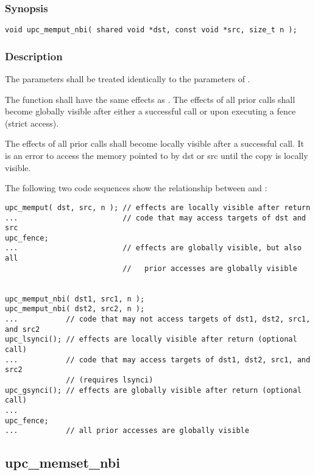 \subsubsection{Synopsis}

\begin{verbatim}
void upc_memput_nbi( shared void *dst, const void *src, size_t n );
\end{verbatim}

\subsubsection{Description}

\npf The parameters shall be treated identically to the parameters of
\memput{}.

\np The \function{} function shall have the same effects as \memput{}.
The effects of all prior \function{} calls shall become globally visible after 
either a successful \gsynci{} call or upon executing a fence (strict access).

\np The effects of all prior \function{} calls shall become locally 
visible after a successful \lsynci{} call.  It is an error to access the memory
pointed to by dst or src until the copy is locally visible.

\np The following two code sequences show the relationship between
\memput{} and \function{}:

\begin{verbatim} 
upc_memput( dst, src, n ); // effects are locally visible after return
...                        // code that may access targets of dst and src
upc_fence;                 
...                        // effects are globally visible, but also all
                           //   prior accesses are globally visible


upc_memput_nbi( dst1, src1, n );
upc_memput_nbi( dst2, src2, n );
...           // code that may not access targets of dst1, dst2, src1, and src2
upc_lsynci(); // effects are locally visible after return (optional call)
...           // code that may access targets of dst1, dst2, src1, and src2
              // (requires lsynci)
upc_gsynci(); // effects are globally visible after return (optional call)
...
upc_fence;
...           // all prior accesses are globally visible
\end{verbatim}

\newpage
\subsection{upc\_memset\_nbi}
\def\function{{\tt upc\_memset\_nbi}}

